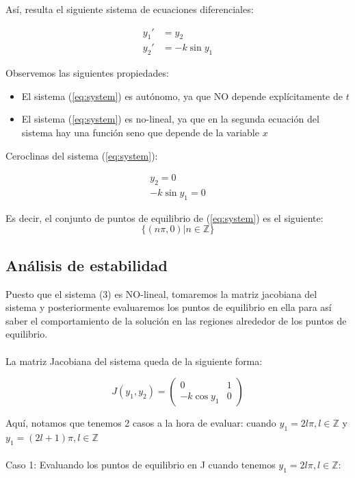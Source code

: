 \documentclass[10pt,letterpaper,titlepage]{article}
\begin{document}
As\'i, resulta el siguiente sistema de ecuaciones diferenciales:

\begin{equation}\label{eq:system}
	\begin{split}
		y_{1}' & = y_{2}\\
		y_{2}' & = -k\sin y_{1}
	\end{split}
\end{equation}

Observemos las siguientes propiedades:
\begin{itemize}
	\item El sistema (\ref{eq:system}) es aut\'onomo, ya que NO depende expl\'icitamente de $t$
	\item El sistema (\ref{eq:system}) es no-lineal, ya que en la segunda ecuaci\'on del sistema hay una funci\'on seno que depende de la variable $x$
\end{itemize}

Ceroclinas del sistema (\ref{eq:system}):

\begin{equation}
	\begin{split}
		y_{2} = 0\\
		-k\sin y_{1} = 0
	\end{split}
\end{equation}

Es decir, el conjunto de puntos de equilibrio de (\ref{eq:system}) es el siguiente:
\begin{equation}
	\{(n \pi, 0) | n \in \mathbb{Z}\}
\end{equation}

\subsection{Análisis de estabilidad}
Puesto que el sistema (3) es NO-lineal, tomaremos la matriz jacobiana del sistema y posteriormente evaluaremos los puntos de equilibrio en ella para as\'i saber el comportamiento de la soluci\'on en las regiones alrededor de los puntos de equilibrio.\\\\
La matriz Jacobiana del sistema queda de la siguiente forma:

\[
	J(y_{1},y_{2}) = \begin{pmatrix}
		0 & 1\\
		-k \cos y_{1} & 0
	\end{pmatrix}
\]

Aqu\'i, notamos que tenemos 2 casos a la hora de evaluar: cuando $y_{1}= 2l\pi, l \in \mathbb{Z}$ y $y_{1}= (2l+1)\pi, l \in \mathbb{Z}$\\\\
Caso 1: Evaluando los puntos de equilibrio en J cuando tenemos $y_{1}= 2l\pi, l \in \mathbb{Z}$:
\end{document}
